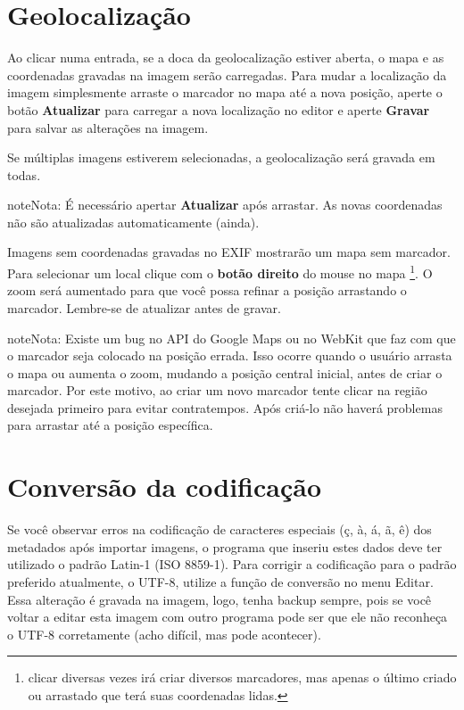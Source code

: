 \documentclass[letterpaper,10pt,portuguese]{manual}
\begin{document}
\section{Geolocalização}

Ao clicar numa entrada, se a doca da geolocalização estiver aberta, o mapa e as
coordenadas gravadas na imagem serão carregadas. Para mudar a localização da
imagem simplesmente arraste o marcador no mapa até a nova posição, aperte
o botão \textbf{Atualizar} para carregar a nova localização no editor e aperte
\textbf{Gravar} para salvar as alterações na imagem.

Se múltiplas imagens estiverem selecionadas, a geolocalização será gravada em
todas.

\begin{notice}{note}{Nota:}
É necessário apertar \textbf{Atualizar} após arrastar. As novas coordenadas não
são atualizadas automaticamente (ainda).
\end{notice}

Imagens sem coordenadas gravadas no EXIF mostrarão um mapa sem marcador. Para
selecionar um local clique com o \textbf{botão direito} do mouse no mapa \footnote{
clicar diversas vezes irá criar diversos marcadores, mas apenas o último
criado ou arrastado que terá suas coordenadas lidas.
}. O zoom
será aumentado para que você possa refinar a posição arrastando o marcador.
Lembre-se de atualizar antes de gravar.

\begin{notice}{note}{Nota:}
Existe um bug no API do Google Maps ou no WebKit que faz com que o marcador
seja colocado na posição errada. Isso ocorre quando o usuário arrasta o
mapa ou aumenta o zoom, mudando a posição central inicial, antes de criar o
marcador. Por este motivo, ao criar um novo marcador tente clicar na região
desejada primeiro para evitar contratempos. Após criá-lo não haverá problemas
para arrastar até a posição específica.
\end{notice}


\section{Conversão da codificação}

Se você observar erros na codificação de caracteres especiais (ç, à, á, ã, ê)
dos metadados após importar imagens, o programa que inseriu estes dados deve
ter utilizado o padrão Latin-1 (ISO 8859-1). Para corrigir a codificação para o
padrão preferido atualmente, o UTF-8, utilize a função de conversão no menu
Editar. Essa alteração é gravada na imagem, logo, tenha backup sempre, pois se
você voltar a editar esta imagem com outro programa pode ser que ele não
reconheça o UTF-8 corretamente (acho difícil, mas pode acontecer).
\end{document}
